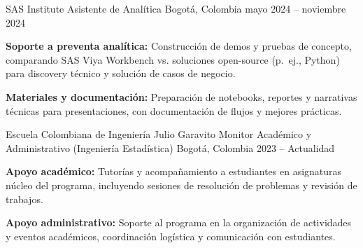 
\begin{cventries}

  \cventry
    {SAS Institute} %
    {Asistente de Analítica} %
    {Bogotá, Colombia} %
    {mayo 2024 -- noviembre 2024} %
    {
      \begin{cvitems}
        \item {\textbf{Soporte a preventa analítica:} Construcción de demos y pruebas de concepto, comparando SAS Viya Workbench vs. soluciones open-source (p.\ ej., Python) para discovery técnico y solución de casos de negocio.}
        \item {\textbf{Materiales y documentación:} Preparación de notebooks, reportes y narrativas técnicas para presentaciones, con documentación de flujos y mejores prácticas.}
      \end{cvitems}
      \vspace{0.3em}
    }

  \vspace{0.6em}

  \cventry
    {Escuela Colombiana de Ingeniería Julio Garavito} %
    {Monitor Académico y Administrativo (Ingeniería Estadística)} %
    {Bogotá, Colombia} %
    {2023 -- Actualidad} %
    {
      \begin{cvitems}
        \item {\textbf{Apoyo académico:} Tutorías y acompañamiento a estudiantes en asignaturas núcleo del programa, incluyendo sesiones de resolución de problemas y revisión de trabajos.}
        \item {\textbf{Apoyo administrativo:} Soporte al programa en la organización de actividades y eventos académicos, coordinación logística y comunicación con estudiantes.}
      \end{cvitems}
    }

\end{cventries}
